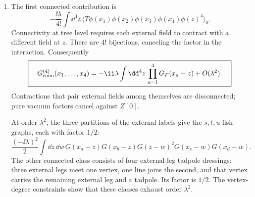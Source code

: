 \begin{enumerate}
\begin{enumerate}
At second order the three non-vacuum topologies are
\[
\begin{split}
 &\frac{(-\ii\lambda)^2}{6}\int \dd z\,\dd w\,
 G(x-z)G(z-w)^3G(w-y),\\
 &\frac{(-\ii\lambda)^2}{4}\int \dd z\,\dd w\,
 G(x-z)G(z-w)G(w-y)G(0)^2,\\
 &\frac{(-\ii\lambda)^2}{4}\int \dd z\,\dd w\,
 G(x-z)G(y-z)G(z-w)^2G(0),
\end{split}
\]
with distinct external attachments included.  The coefficients follow
by pairing the half-edges at the two labeled vertices; every omitted
pairing has a vacuum component and cancels against \(Z[0]\).
\item
The first connected contribution is
\[
 -\frac{\ii\lambda}{4!}\int \dd^4z\,
 \langle T\phi(x_1)\phi(x_2)\phi(x_3)\phi(x_4)\phi(z)^4\rangle_0.
\]
Connectivity at tree level requires each external field to contract with
a different field at \(z\).  There are \(4!\) bijections, canceling the
factor in the interaction.  Consequently
\[
 \boxed{\quad
 G^{(4)}_{\rm conn}(x_1,\ldots,x_4)
 =-\ii\lambda\int \dd^4z\,
 \prod_{a=1}^{4}G_F(x_a-z)+O(\lambda^2).
 \quad}
\]
Contractions that pair external fields among themselves are disconnected;
pure vacuum factors cancel against \(Z[0]\).

At order \(\lambda^2\), the three partitions of the external labels give
the \(s,t,u\) fish graphs, each with factor \(1/2\):
\[
 \frac{(-\ii\lambda)^2}{2}\int \dd z\,\dd w\,
 G(x_a-z)G(x_b-z)G(z-w)^2G(x_c-w)G(x_d-w).
\]
The other connected class consists of four external-leg tadpole
dressings: three external legs meet one vertex, one line joins the
second, and that vertex carries the remaining external leg and a
tadpole.  Its factor is \(1/2\).  The vertex-degree constraints show
that these classes exhaust order \(\lambda^2\).
\end{enumerate}


\end{enumerate}
